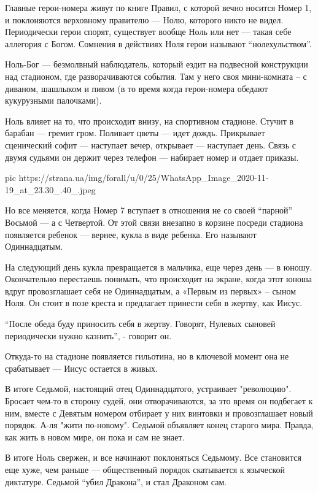 Главные герои-номера живут по книге Правил, с которой вечно носится Номер
1, и поклоняются верховному правителю --- Нолю, которого никто не видел.
Периодически герои спорят, существует вообще Ноль или нет --- такая себе
аллегория с Богом. Сомнения в действиях Ноля герои называют
\enquote{нолехульством}.

Ноль-Бог --- безмолвный наблюдатель, который ездит на подвесной конструкции
над стадионом, где разворачиваются события. Там у него своя мини-комната –
с диваном, шашлыком и пивом (в то время когда герои-номера обедают
кукурузными палочками).

Ноль влияет на то, что происходит внизу, на спортивном стадионе. Стучит в
барабан --- гремит гром. Поливает цветы --- идет дождь. Прикрывает сценический
софит --- наступает вечер, открывает --- наступает день. Связь с двумя судьями
он держит через телефон --- набирает номер и отдает приказы.

\ifcmt
pic https://strana.ua/img/forall/u/0/25/WhatsApp_Image_2020-11-19_at_23.30_.40_.jpeg
\fi

Но все меняется, когда Номер 7 вступает в отношения не со своей \enquote{парной}
Восьмой --- а с Четвертой. От этой связи внезапно в корзине посреди стадиона
появляется ребенок --- вернее, кукла в виде ребенка. Его называют
Одиннадцатым.

На следующий день кукла превращается в мальчика, еще через день --- в юношу.
Окончательно перестаешь понимать, что происходит на экране, когда этот
юноша вдруг провозглашает себя не Одиннадцатым, а «Первым из первых» –
сыном Ноля. Он стоит в позе креста и предлагает принести себя в жертву,
как Иисус.

\enquote{После обеда буду приносить себя в жертву. Говорят, Нулевых сыновей
периодически нужно казнить}, - говорит он.

Откуда-то на стадионе появляется гильотина, но в ключевой момент она не
срабатывает --- Иисус остается в живых.

В итоге Седьмой, настоящий отец Одиннадцатого, устраивает "революцию".
Бросает чем-то в сторону судей, они отворачиваются, за это время он
подбегает к ним, вместе с Девятым номером отбирает у них винтовки и
провозглашает новый порядок. А-ля "жити по-новому". Седьмой объявляет
конец старого мира. Правда, как жить в новом мире, он пока и сам не знает.

В итоге Ноль свержен, и все начинают поклоняться Седьмому. Все становится
еще хуже, чем раньше --- общественный порядок скатывается к языческой
диктатуре. Седьмой \enquote{убил Дракона}, и стал Драконом сам.


